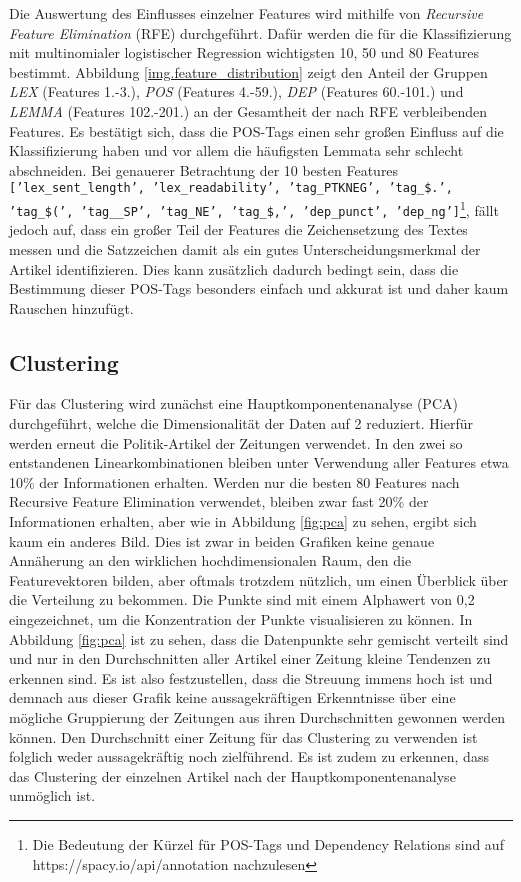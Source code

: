 Die Auswertung des Einflusses einzelner Features wird mithilfe von \emph{Recursive Feature Elimination} (RFE) durchgeführt. Dafür werden die für die Klassifizierung mit multinomialer logistischer Regression wichtigsten 10, 50 und 80 Features bestimmt. Abbildung \ref{img.feature_distribution} zeigt den Anteil der Gruppen \textit{LEX} (Features 1.-3.), \textit{POS} (Features 4.-59.), \textit{DEP} (Features 60.-101.) und \textit{LEMMA} (Features 102.-201.) an der Gesamtheit der nach RFE verbleibenden Features. Es bestätigt sich, dass die POS-Tags einen sehr großen Einfluss auf die Klassifizierung haben und vor allem die häufigsten Lemmata sehr schlecht abschneiden. Bei genauerer Betrachtung der 10 besten Features \texttt{['lex\_sent\_length', 'lex\_readability', 'tag\_PTKNEG', 'tag\_\$.', 'tag\_\$(', 'tag\_\_SP', 'tag\_NE', 'tag\_\$,', 'dep\_punct', 'dep\_ng']}\footnote{Die Bedeutung der Kürzel für POS-Tags und Dependency Relations sind auf https://spacy.io/api/annotation nachzulesen}, \newline fällt jedoch auf, dass ein großer Teil der Features die Zeichensetzung des Textes messen und die Satzzeichen damit als ein gutes Unterscheidungsmerkmal der Artikel identifizieren. Dies kann zusätzlich dadurch bedingt sein, dass die Bestimmung dieser POS-Tags besonders einfach und akkurat ist und daher kaum Rauschen hinzufügt.

\subsection{Clustering}
Für das Clustering wird zunächst eine Hauptkomponentenanalyse (PCA) durchgeführt, welche die Dimensionalität der Daten auf 2 reduziert. Hierfür werden erneut die Politik-Artikel der Zeitungen verwendet. In den zwei so entstandenen Linearkombinationen bleiben unter Verwendung aller Features etwa 10\% der Informationen erhalten. Werden nur die besten 80 Features nach Recursive Feature Elimination verwendet, bleiben zwar fast 20\% der Informationen erhalten, aber wie in Abbildung \ref{fig:pca} zu sehen, ergibt sich kaum ein anderes Bild. Dies ist zwar in beiden Grafiken keine genaue Annäherung an den wirklichen hochdimensionalen Raum, den die Featurevektoren bilden, aber oftmals trotzdem nützlich, um einen Überblick über die Verteilung zu bekommen. Die Punkte sind mit einem Alphawert von 0,2 eingezeichnet, um die Konzentration der Punkte visualisieren zu können. In Abbildung \ref{fig:pca} ist zu sehen, dass die Datenpunkte sehr gemischt verteilt sind und nur in den Durchschnitten aller Artikel einer Zeitung kleine Tendenzen zu erkennen sind. Es ist also festzustellen, dass die Streuung immens hoch ist und demnach aus dieser Grafik keine aussagekräftigen Erkenntnisse über eine mögliche Gruppierung der Zeitungen aus ihren Durchschnitten gewonnen werden können. Den Durchschnitt einer Zeitung für das Clustering zu verwenden ist folglich weder aussagekräftig noch zielführend. Es ist zudem zu erkennen, dass das Clustering der einzelnen Artikel nach der Hauptkomponentenanalyse unmöglich ist.

